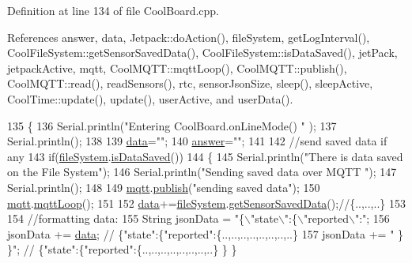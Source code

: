 Definition at line 134 of file Cool\+Board.\+cpp.



References answer, data, Jetpack\+::do\+Action(), file\+System, get\+Log\+Interval(), Cool\+File\+System\+::get\+Sensor\+Saved\+Data(), Cool\+File\+System\+::is\+Data\+Saved(), jet\+Pack, jetpack\+Active, mqtt, Cool\+M\+Q\+T\+T\+::mqtt\+Loop(), Cool\+M\+Q\+T\+T\+::publish(), Cool\+M\+Q\+T\+T\+::read(), read\+Sensors(), rtc, sensor\+Json\+Size, sleep(), sleep\+Active, Cool\+Time\+::update(), update(), user\+Active, and user\+Data().


\begin{DoxyCode}
135 \{
136     Serial.println(\textcolor{stringliteral}{"Entering CoolBoard.onLineMode() "} );
137     Serial.println();
138 
139     \hyperlink{classCoolBoard_a427fb753dd8575bdf821c70a5c63d695}{data}=\textcolor{stringliteral}{""};
140     \hyperlink{classCoolBoard_a7b835fafd449e5282f7f91d787a2dc15}{answer}=\textcolor{stringliteral}{""};
141 
142     \textcolor{comment}{//send saved data if any}
143     \textcolor{keywordflow}{if}(\hyperlink{classCoolBoard_a42c2586fbb13ff7f06538e9284e8538d}{fileSystem}.\hyperlink{classCoolFileSystem_a5a7eaeea7a9fbf8aaef651d862fa3b5b}{isDataSaved}())
144     \{
145         Serial.println(\textcolor{stringliteral}{"There is data saved on the File System"});
146         Serial.println(\textcolor{stringliteral}{"Sending saved data over MQTT "});
147         Serial.println();
148 
149         \hyperlink{classCoolBoard_a2399f44d7c23c1149a335cb3b46d90f1}{mqtt}.\hyperlink{classCoolMQTT_ace977b3e90ab14b1199fe5c4fb0a13ec}{publish}(\textcolor{stringliteral}{"sending saved data"});
150         \hyperlink{classCoolBoard_a2399f44d7c23c1149a335cb3b46d90f1}{mqtt}.\hyperlink{classCoolMQTT_aa5eaae967b562b62cbcf2b8d81f6e5d5}{mqttLoop}();
151 
152         \hyperlink{classCoolBoard_a427fb753dd8575bdf821c70a5c63d695}{data}+=\hyperlink{classCoolBoard_a42c2586fbb13ff7f06538e9284e8538d}{fileSystem}.\hyperlink{classCoolFileSystem_a5c58bca3735c0ed3efb268d70ef998ef}{getSensorSavedData}();\textcolor{comment}{//\{..,..,..\}}
153 
154         \textcolor{comment}{//formatting data:}
155         String jsonData = \textcolor{stringliteral}{"\{\(\backslash\)"state\(\backslash\)":\{\(\backslash\)"reported\(\backslash\)":"};
156         jsonData += \hyperlink{classCoolBoard_a427fb753dd8575bdf821c70a5c63d695}{data}; \textcolor{comment}{// \{"state":\{"reported":\{..,..,..,..,..,..,..,..\}}
157         jsonData += \textcolor{stringliteral}{" \} \}"}; \textcolor{comment}{// \{"state":\{"reported":\{..,..,..,..,..,..,..,..\}  \} \}}

\end{DoxyCode}
